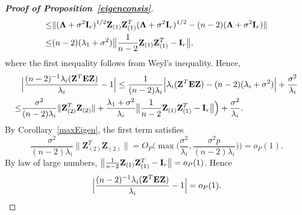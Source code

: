 \documentclass[review]{elsarticle}
\newcommand{\bZ}{\mathbf{Z}}
\theoremstyle{plain}
\theoremstyle{definition}
\theoremstyle{remark}
\begin{document}
\begin{proof}[\textbf{Proof of Proposition~\ref{eigenconsis}}]
{$$\begin{aligned}
        \leq &
        \|
     (\bLambda+\sigma^2 \BI_r)^{1/2}\bZ_{(1)}\bZ_{(1)}^T(\bLambda+\sigma^2 \BI_r)^{1/2}
        -(n-2)(\bLambda+\sigma^2 \BI_r)
        \|\\
        \leq &
        (n-2)(\lambda_1 + \sigma^2)\big\|\frac{1}{n-2}\bZ_{(1)}\bZ_{(1)}^T-\BI_r\big\|,
    \end{aligned}
    $$
    where the first inequality follows from Weyl's inequality.
    Hence,
        $$
        \begin{aligned}
            &\Big|\frac{(n-2)^{-1}\lambda_i(\bZ^T \BE \bZ)}{\lambda_i}-1\Big|
            \leq \frac{1}{(n-2)\lambda_i}\Big|\lambda_i(\bZ^T \BE \bZ)-(n-2)(\lambda_i+\sigma^2)\Big|+\frac{\sigma^2}{\lambda_i}\\
            \leq&\frac{\sigma^2}{(n-2)\lambda_i}\|\bZ_{(2)}^T \bZ_{(2)}\|+\frac{\lambda_1+\sigma^2}{\lambda_i}\big\|\frac{1}{n-2}\bZ_{(1)}\bZ_{(1)}^T-\BI_r\big\|\Big)+\frac{\sigma^2}{\lambda_i}.
        \end{aligned}
        $$
        By Corollary~\ref{maxEigen}, the first term satisfies
        $$
        \frac{\sigma^2}{(n-2)\lambda_i}\|\bZ_{(2)}^T \bZ_{(2)}\|
        =O_P\Big(\max\big(\frac{\sigma^2}{\lambda_i},\frac{\sigma^2 p}{(n-2)\lambda_i}\big)\Big)=o_P(1).
        $$
        By law of large numbers, $\big\|\frac{1}{n-2}\bZ_{(1)}\bZ_{(1)}^T-\BI_r\big\|=o_P(1)$. Hence
        $$
            \Big|\frac{(n-2)^{-1}\lambda_i(\bZ^T \BE \bZ)}{\lambda_i}-1\Big|=o_P(1).
        $$
}

\end{proof}
\end{document}
